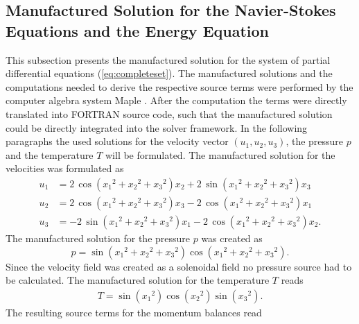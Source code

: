 \subsection{Manufactured Solution for the Navier-Stokes Equations and the Energy Equation}
\label{sec:manufacturedsolution}

This subsection presents the manufactured solution for the system of partial differential equations (\ref{eq:completeset}). The manufactured solutions and the computations needed to derive the respective source terms were performed by the computer algebra system Maple \textregistered \cite{maple}. After the computation the terms were directly translated into FORTRAN source code, such that the manufactured solution could be directly integrated into the solver framework. In the following paragraphs the used solutions for the velocity vector \((u_1,u_2,u_3)\), the pressure \(p\) and the temperature \(T\) will be formulated. The manufactured solution for the velocities was formulated as
\begin{align*}
  u_1 &= 2\,\cos \left( {x_1}^{2}+{x_2}^{2}+{x_3}^{2} \right) x_2+2\,\sin \left( {x_1}^{2}+{x_2}^{2}+{x_3}^{2} \right) x_3 \\[1.0em]
  u_2 &= 2\,\cos \left( {x_1}^{2}+{x_2}^{2}+{x_3}^{2} \right) x_3-2\,\cos \left( {x_1}^{2 }+{x_2}^{2}+{x_3}^{2} \right) x_1 \\[1.0em]
  u_3 &= -2\,\sin \left( {x_1}^{2}+{x_2}^{2}+{x_3}^{2} \right) x_1-2\,\cos \left( {x_1}^{ 2}+{x_2}^{2}+{x_3}^{2} \right) x_2.
\end{align*}
The manufactured solution for the pressure \(p\) was created as
\begin{displaymath}
  p = \sin \left( {x_1}^{2}+{x_2}^{2}+{x_3}^{2} \right) \cos \left( {x_1}^{2}+ {x_2}^{2 }+{x_3}^{2} \right).
\end{displaymath}
Since the velocity field was created as a solenoidal field no pressure source had to be calculated. The manufactured solution for the temperature \(T\) reads
\begin{align*}
  T=\sin \left( {x_1}^{2} \right) \cos \left( {x_2}^{2} \right) \sin \left( {x_3 }^{2} \right).
\end{align*}
The resulting source terms for the momentum balances read
